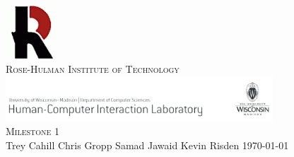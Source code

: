 \documentclass{article}
\begin{document}
\begin{titlepage}
\begin{center}
\includegraphics[width=0.15\textwidth]{../images/rh}\\[1.0cm]
\textsc{\large Rose-Hulman Institute of Technology}\\[1.5cm]
\includegraphics[width=0.75\textwidth]{../images/pss}\\[1.0cm]
\textsc{\large Milestone 1}\\[1.0cm]
\large Trey Cahill \hspace{0.2cm} Chris Gropp \hspace{0.2cm} Samad Jawaid \hspace{0.2cm} Kevin Risden
\vfill
\large \today
\end{center}
\end{titlepage}

\tableofcontents
\newpage
\end{document}
